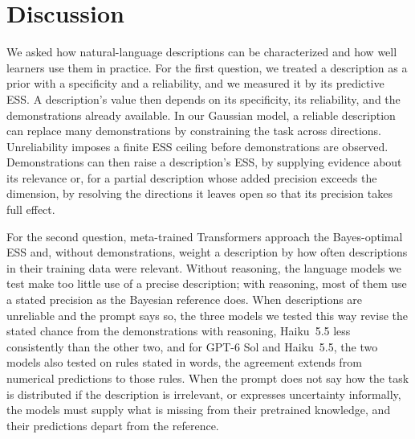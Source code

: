 \chapter{Discussion}\label{ch:conclusion}

We asked how natural-language descriptions can be characterized and how well learners use them in practice. For the first question, we treated a description as a prior with a specificity and a reliability, and we measured it by its predictive ESS. A description's value then depends on its specificity, its reliability, and the demonstrations already available. In our Gaussian model, a reliable description can replace many demonstrations by constraining the task across directions. Unreliability imposes a finite ESS ceiling before demonstrations are observed. Demonstrations can then raise a description's ESS, by supplying evidence about its relevance or, for a partial description whose added precision exceeds the dimension, by resolving the directions it leaves open so that its precision takes full effect.

For the second question, meta-trained Transformers approach the Bayes-optimal ESS and, without demonstrations, weight a description by how often descriptions in their training data were relevant. Without reasoning, the language models we test make too little use of a precise description; with reasoning, most of them use a stated precision as the Bayesian reference does. When descriptions are unreliable and the prompt says so, the three models we tested this way revise the stated chance from the demonstrations with reasoning, Haiku~5.5 less consistently than the other two, and for GPT-6 Sol and Haiku~5.5, the two models also tested on rules stated in words, the agreement extends from numerical predictions to those rules. When the prompt does not say how the task is distributed if the description is irrelevant, or expresses uncertainty informally, the models must supply what is missing from their pretrained knowledge, and their predictions depart from the reference.


